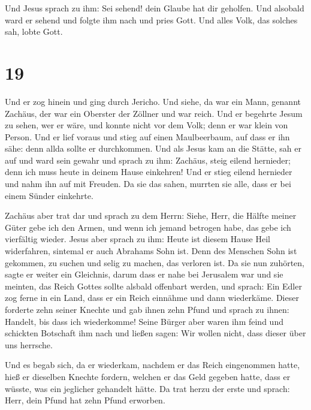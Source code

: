  Und Jesus sprach zu ihm: Sei sehend! dein Glaube hat dir
geholfen.  Und alsobald ward er sehend und folgte ihm
nach und pries Gott. Und alles Volk, das solches sah, lobte Gott.

\hypertarget{section-18}{%
\section{19}\label{section-18}}

 Und er zog hinein und ging durch Jericho. 
Und siehe, da war ein Mann, genannt Zachäus, der war ein Oberster der
Zöllner und war reich.  Und er begehrte Jesum zu sehen,
wer er wäre, und konnte nicht vor dem Volk; denn er war klein von
Person.  Und er lief voraus und stieg auf einen
Maulbeerbaum, auf dass er ihn sähe: denn allda sollte er durchkommen.
 Und als Jesus kam an die Stätte, sah er auf und ward sein
gewahr und sprach zu ihm: Zachäus, steig eilend hernieder; denn ich muss
heute in deinem Hause einkehren!  Und er stieg eilend
hernieder und nahm ihn auf mit Freuden.  Da sie das sahen,
murrten sie alle, dass er bei einem Sünder einkehrte.

 Zachäus aber trat dar und sprach zu dem Herrn: Siehe,
Herr, die Hälfte meiner Güter gebe ich den Armen, und wenn ich jemand
betrogen habe, das gebe ich vierfältig wieder.  Jesus aber
sprach zu ihm: Heute ist diesem Hause Heil widerfahren, sintemal er auch
Abrahams Sohn ist.  Denn des Menschen Sohn ist gekommen,
zu suchen und selig zu machen, das verloren ist.  Da sie
nun zuhörten, sagte er weiter ein Gleichnis, darum dass er nahe bei
Jerusalem war und sie meinten, das Reich Gottes sollte alsbald offenbart
werden,  und sprach: Ein Edler zog ferne in ein Land,
dass er ein Reich einnähme und dann wiederkäme.  Dieser
forderte zehn seiner Knechte und gab ihnen zehn Pfund und sprach zu
ihnen: Handelt, bis dass ich wiederkomme!  Seine Bürger
aber waren ihm feind und schickten Botschaft ihm nach und ließen sagen:
Wir wollen nicht, dass dieser über uns herrsche.

 Und es begab sich, da er wiederkam, nachdem er das Reich
eingenommen hatte, hieß er dieselben Knechte fordern, welchen er das
Geld gegeben hatte, dass er wüsste, was ein jeglicher gehandelt hätte.
 Da trat herzu der erste und sprach: Herr, dein Pfund hat
zehn Pfund erworben.

